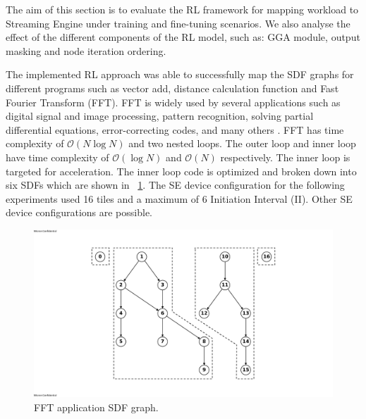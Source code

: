 
The aim of this section is to evaluate the RL framework for mapping workload to Streaming Engine under training and fine-tuning scenarios. 
We also analyse the effect of the different components of the RL model, such as: GGA module, output masking and node iteration ordering.

The implemented RL approach was able to successfully map the SDF graphs for different programs such as vector add, distance calculation function and Fast Fourier Transform (FFT). 
FFT is widely used by several applications such as digital signal and image processing, pattern recognition, solving partial differential equations, error-correcting codes, and many others \cite{814659}.
FFT has time complexity of $\mathcal{O}(N\log{N})$ and two nested loops.
The outer loop and inner loop have time complexity of $\mathcal{O}(\log{N})$ and $\mathcal{O}(N)$ respectively.
The inner loop is targeted for acceleration.
The inner loop code is optimized and broken down into six SDFs which are shown in \figurename~\ref{fig:ifft_graph}.
The SE device configuration for the following experiments used 16 tiles and a maximum of 6 Initiation Interval (II).
Other SE device configurations are possible.

\begin{figure}[tb]
  \centering
  \includegraphics[width=\linewidth]{fig/ifft_graph.pdf}
  \caption{FFT application SDF graph.}
  \label{fig:ifft_graph}
\end{figure}


